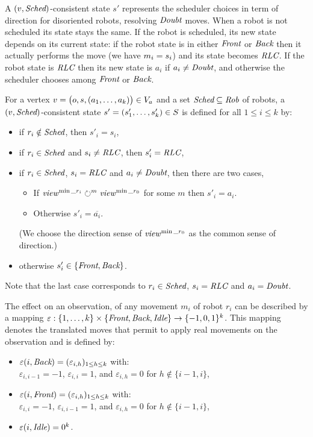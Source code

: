 A $(v, \textit{Sched})$-consistent state $s'$ represents the scheduler choices in term of direction for disoriented robots, 
resolving $\textit{Doubt}$ moves.
When a robot is not scheduled its state stays the same. 
If the robot is scheduled, its new state depends on its current state:  if the robot state is in either $\textit{Front}$ or $\textit{Back}$ then 
it actually performs the move (we have $m_i = s_i$) and its state becomes $\textit{RLC}$. If the robot state is $\textit{RLC}$ then 
its new state is $a_i$ if $a_i \neq \textit{Doubt}$, and otherwise the scheduler chooses among $\textit{Front}$ or $\textit{Back}$. 
\begin{definition}\label{def:mapCo}
 For a vertex $v= \bigl (o, s, (a_1, \dots, a_k)\bigr ) \in V_a$ and a set 
 $\textit{Sched} \subseteq \textit{Rob}$ of robots, a $(v, \textit{Sched})$-consistent state $s' =(s'_1, \ldots, s'_k) \in S$ is defined 
 for all $1 \leq i \leq k$
 by:  \begin{itemize}
 \item if $r_i \notin \textit{Sched}$,  then $s'_i =  s_i$, 
 \item if $r_i \in \textit{Sched}$ and $s_i \neq \textit{RLC}$,  then $s'_i =   \textit{RLC}$, 
 \item if $r_i \in \textit{Sched}$, $s_i = \textit{RLC}$ and  $a_i \neq \textit{Doubt}$,  then there are two cases, 
	 \begin{itemize}
	\item If $\mathit{view}^{\min\_r_i} \circlearrowright ^m \mathit{view}^{\min\_r_0}$ for some $m$ then
		$s'_i = a_i$.
	\item Otherwise $s'_i = \overline{a_i}$. 
	\end{itemize}
	(We choose the direction sense of  $\mathit{view}^{\min\_r_0}$  as the common sense of direction.)
 \item otherwise $s'_i \in \{\textit{Front}, \textit{Back}\}$.
 \end{itemize}
 Note that the last case corresponds to $r_i \in \textit{Sched}$, $s_i = \textit{RLC}$ and $a_i = \textit{Doubt}$.
 \end{definition}
 
 
The effect on an observation, of any movement $m_i$ of robot $r_i$ can be described by a mapping 
$\varepsilon:  \{1, \dots, k\}\times\{\textit{Front}, \textit{Back}, \textit{Idle}\} \to \{-1, 0, 1\}^k$.
This mapping denotes the translated moves that permit to apply real movements on the observation and is defined by:  
\begin{itemize}
\item $\varepsilon(i, \textit{Back})= (\varepsilon_{i, h})_{1\leq h\leq k}$ with:  \\
$\varepsilon_{i, i-1}=-1$, $\varepsilon_{i, i}=1$, and $\varepsilon_{i, h}=0$ for $h \notin \{i-1, i\}$, 
\item $\varepsilon(i, \textit{Front})= (\varepsilon_{i, h})_{1\leq h\leq k}$ with:  \\
 $\varepsilon_{i, i}=-1$, $\varepsilon_{i, i-1}=1$, and $\varepsilon_{i, h}=0$ for $h \notin \{i-1, i\}$, 
 \item $\varepsilon(i, \textit{Idle})= 0^k$. 
\end{itemize}

